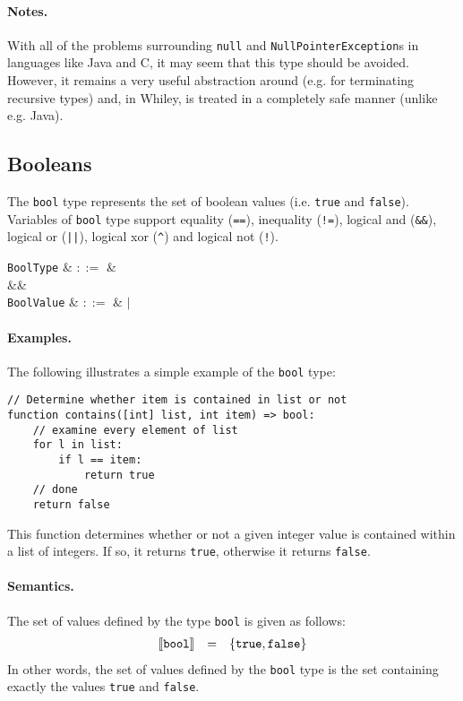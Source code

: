 \paragraph{Notes.}  With all of the problems surrounding \lstinline{null} and \lstinline{NullPointerException}s in languages like Java and C, it may seem that this type should be avoided. However, it remains a very useful abstraction around (e.g. for terminating recursive types) and, in Whiley, is treated in a completely safe manner (unlike e.g. Java).


\subsection{Booleans}

The \lstinline{bool} type represents the set of boolean values (i.e. \lstinline{true} and \lstinline{false}).  Variables of \lstinline{bool} type support equality (\lstinline{==}), inequality (\lstinline{!=}), logical and (\lstinline{&&}), logical or (\lstinline{||}), logical xor (\lstinline{^}) and logical not (\lstinline{!}).

\begin{syntax}
 \verb+BoolType+ & $::=$ &  \\
&&\\
\verb+BoolValue+ & $::=$ &  $|$  \\
\end{syntax}

\paragraph{Examples.} The following illustrates a simple example of the \lstinline{bool} type:

\begin{lstlisting}
// Determine whether item is contained in list or not
function contains([int] list, int item) => bool:
    // examine every element of list
    for l in list:
        if l == item:
            return true
    // done
    return false
\end{lstlisting}
This function determines whether or not a given integer value is contained within a list of integers.  If so, it returns \lstinline{true}, otherwise it returns \lstinline{false}.

\paragraph{Semantics.}  The set of values defined by the type \lstinline{bool} is given as follows:
\begin{displaymath}
\begin{array}{rcl}
\llbracket{\tt bool}\rrbracket & = & \{{\tt true},{\tt false}\}\\
\end{array}
\end{displaymath}
In other words, the set of values defined by the \lstinline{bool} type is the set containing exactly the values \lstinline{true} and \lstinline{false}.


